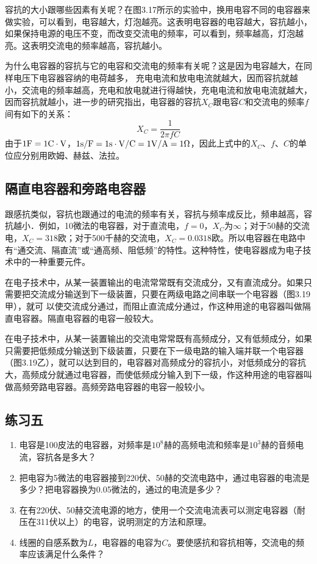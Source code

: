 容抗的大小跟哪些因素有关呢？在图3.17所示的实验中，换用电容不同的电容器来做实验，可以看到，电容越大，灯泡越亮。这表明电容器的电容越大，容抗越小，如果保持电源的电压不变，而改变交流电的频率，可以看到，频率越高，灯泡越亮。这表明交流电的频率越高，容抗越小。

为什么电容器的容抗与它的电容和交流电的频率有关呢？这是因为电容越大，在同样电压下电容器容纳的电荷越多，
充电电流和放电电流就越大，因而容抗就越小，交流电的频率越高，充电和放电就进行得越快，充电电流和放电电流就越大，因而容抗就越小，进一步的研究指出，电容器的容抗$X_C$跟电容$C$和交流电的频率$f$间有如下的关系：
\[X_C=\frac{1}{2\pi fC} \]
由于$1{\rm F}=1{\rm C\cdot V}$，$1{\rm s/F}=1{\rm s}\cdot {\rm V/C}=1{\rm V/A}=1\Omega$，因此上式中的$X_C$、$f$、$C$的单位应分别用欧姆、赫兹、法拉。

\subsection{隔直电容器和旁路电容器}

跟感抗类似，容抗也跟通过的电流的频率有关，容抗与频率成反比，频串越高，容抗越小．例如，10微法的电容器，对于直流电，$f=0$，$X_C$为$\infty$；对于50赫的交流电，$X_C=318$欧；对于500千赫的交流电，$X_C=0.0318$欧。所以电容器在电路中有“通交流、隔直流”或“通高频、阻低频”的特性。这种特性，使电容器成为电子技术中的一种重要元件。

在电子技术中，从某一装置输出的电流常常既有交流成分，又有直流成分。如果只需要把交流成分输送到下一级装置，只要在两级电路之间串联一个电容器（图3.19甲），就可
以使交流成分通过，而阻止直流成分通过，作这种用途的电容器叫做隔直电容器。隔直电容器的电容一般较大。

在电子技术中，从某一装置输出的交流电常常既有高频成分，又有低频成分，如果只需要把低频成分输送到下级装置，只要在下一级电路的输入端并联一个电容器（图3.19乙），就可以达到目的，电容器对高频成分的容抗小，对低频成分的容抗大，高频成分就通过电容器，而使低频成分输入到下一级，作这种用途的电容器叫做高频旁路电容器。高频旁路电容器的电容一般较小。

\subsection*{练习五}
\begin{enumerate}
    \item 电容是100皮法的电容器，对频率是$10^8$赫的高频电流和频率是$10^3$赫的音频电流，容抗各是多大？
    \item 把电容为5微法的电容器接到220伏、50赫的交流电路中，通过电容器的电流是多少？把电容器换为0.05微法的，通过的电流是多少？
    \item 在有220伏、50赫交流电源的地方，使用一个交流电流表可以测定电容器（耐压在311伏以上）的电容，说明测定的方法和原理。
    \item 线圈的自感系数为$L$，电容器的电容为$C$。要使感抗和容抗相等，交流电的频率应该满足什么条件？
\end{enumerate}

